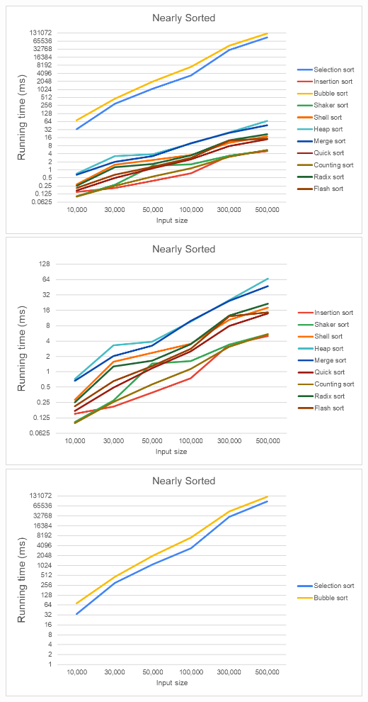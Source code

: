         \includegraphics[width = 1\linewidth]{img/experiment/running time/nearly sorted/1.png}
        \includegraphics[width = 1\linewidth]{img/experiment/running time/nearly sorted/2.png}
        \includegraphics[width = 1\linewidth]{img/experiment/running time/nearly sorted/3.png}
    
